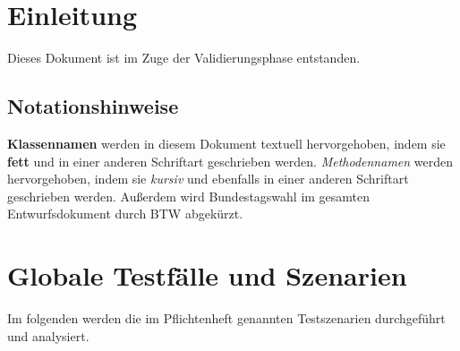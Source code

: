 \documentclass[12pt,a4paper,titlepage]{article}
\newcommand{\myma}{\fontfamily{pcr}\selectfont \textbf}
\newcommand{\mymo}{\fontfamily{pcr}\selectfont \textit}
\begin{document}
\section{Einleitung}

Dieses Dokument ist im Zuge der Validierungsphase entstanden.

\subsection{Notationshinweise}
{\myma{Klassennamen}} werden in diesem Dokument textuell hervorgehoben, indem sie \textbf{fett} und in einer anderen Schriftart geschrieben werden.\newline
{\mymo{Methodennamen}} werden hervorgehoben, indem sie  \textit{kursiv} und ebenfalls in einer anderen Schriftart geschrieben werden.\newline
Außerdem wird Bundestagswahl im gesamten Entwurfsdokument durch BTW abgekürzt.
\newpage

\section{Globale Testfälle und Szenarien}
Im folgenden werden die im Pflichtenheft genannten Testszenarien durchgeführt und analysiert.
\end{document}
